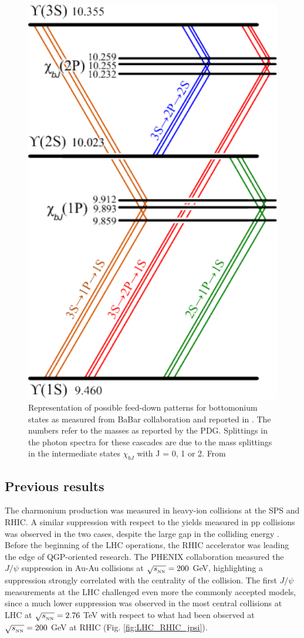 \begin{figure}[!t]
\begin{center}
\includegraphics[width=0.45\linewidth]{Chapters/Analysis/Figs/BottomoniumSpectro.pdf}
\caption{Representation of possible feed-down patterns for bottomonium states as measured from BaBar collaboration and reported in \cite{Lees:2014qea}. The numbers refer to the masses as reported by the PDG. Splittings in the photon spectra for these cascades are due to the mass splittings in the intermediate states $\chi_{bJ}$ with J = 0, 1 or 2. From \cite{Lees:2014qea}}
\label{fig:BBSpectro}
\end{center}
\end{figure}

\subsection{Previous results}

The charmonium production was measured in heavy-ion collisions at the SPS and RHIC. 
A similar suppression with respect to the yields measured in pp collisions was observed in the two cases, despite the large gap in the colliding energy \cite{Rapp:2017chc}.
Before the beginning of the LHC operations, the RHIC accelerator was leading the edge of QGP-oriented research.
The PHENIX collaboration measured the $J/\psi$ suppression in Au-Au collisions at $\sqrt{s_{_{\rm NN}}}=200$ GeV, highlighting a suppression strongly correlated with the centrality of the collision.
The first $J/\psi$ measurements at the LHC challenged even more the commonly accepted models, since a much lower suppression was observed in the most central collisions at LHC at $\sqrt{s_{_{\rm NN}}}=2.76$ TeV with respect to what had been observed at $\sqrt{s_{_{\rm NN}}}=200$ GeV at RHIC (Fig. \ref{fig:LHC_RHIC_jpsi}).

